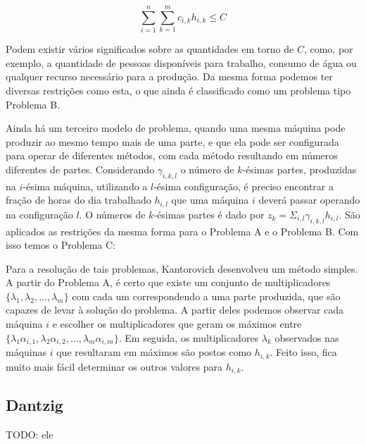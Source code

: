 \begin{equation}
  \sum_{i=1}^n \sum_{k=1}^m c_{i, k} h_{i, k} \leq C
\end{equation}

Podem existir vários significados sobre as quantidades em torno de \(C\), como, por exemplo,
a quantidade de pessoas disponíveis para trabalho, consumo de água ou qualquer recurso
necessário para a produção. Da mesma forma podemos ter diversas restrições como esta,
o que ainda é classificado como um problema tipo Problema B.

Ainda há um terceiro modelo de problema, quando uma mesma máquina pode produzir ao mesmo tempo
mais de uma parte, e que ela pode ser configurada para operar de diferentes métodos, com cada
método resultando em números diferentes de partes. Considerando \( \gamma_{i, k, l} \) o número de
\(k\)-ésimas partes, produzidas na \(i\)-ésima máquina, utilizando a \(l\)-ésima configuração,
é preciso encontrar a fração de horas do dia trabalhado \(h_{i, l}\) que uma máquina \(i\) deverá
passar operando na configuração \(l\). O números de \(k\)-ésimas partes é dado por
\( z_k = \Sigma_{i, l} \gamma_{i, k, l} h_{i, l}\). São aplicados as restrições da mesma forma para o Problema
A e o Problema B. Com isso temos o Problema C:

\begin{maxi!}
{}{  \label{kobj}}{\label{prob_kantorovich}}{}
\end{maxi!}

\vspace {0.5cm}

Para a resolução de tais problemas, Kantorovich desenvolveu um método simples. A partir do
Problema A, é certo que existe um conjunto de multiplicadores \(\{ \lambda_1, \lambda_2, ..., \lambda_m \}\) com
cada um correspondendo a uma parte produzida, que são capazes de levar à solução do problema.
A partir deles podemos observar cada máquina \(i\) e escolher os multiplicadores que geram os
máximos entre \(\{\lambda_1\alpha_{i, 1}, \lambda_2\alpha_{i, 2}, ..., \lambda_m\alpha_{i, m}\}\). Em seguida, os multiplicadores \( \lambda_k \)
observados nas máquinas \(i\) que resultaram em máximos são postos como \(h_{i, k}\). Feito isso,
fica muito mais fácil determinar os outros valores para \( h_{i, k} \).

\subsection{Dantzig}

TODO: ele
